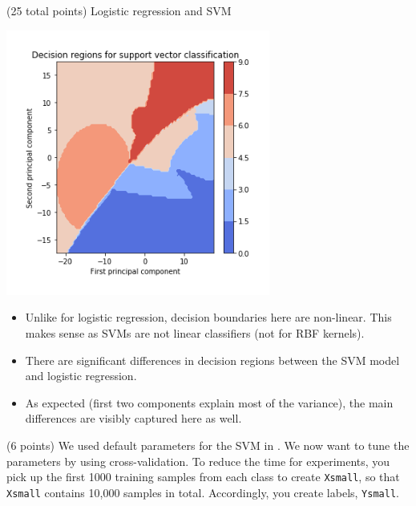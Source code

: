 \documentclass[12pt]{article}
\begin{document}
\begin{question}{(25 total points) Logistic regression and SVM}
\begin{subquestion}
      \begin{answerbox}{35em}
                           \begin{center}
	\includegraphics[width=0.65\textwidth]{imgs/2_4.png}
	\end{center}
	\begin{itemize}
	\itemsep -3pt {}
	\item Unlike for logistic regression, decision boundaries here are non-linear. This makes sense as SVMs are not linear classifiers (not for RBF kernels).
	\item There are significant differences in decision regions between the SVM model and logistic regression.
	\item As expected (first two components explain most of the variance), the main differences are visibly captured here as well.
	\end{itemize}
      \end{answerbox}
  


   \end{subquestion}

   \begin{subquestion}{(6 points)
       We used default parameters for the SVM in .
       We now want to tune the parameters by using cross-validation.
       To reduce the time for experiments, you pick up the first 1000
       training samples from each class to create \texttt{Xsmall}, so that \texttt{Xsmall}
       contains 10,000 samples in total. Accordingly, you create
       labels, \texttt{Ysmall}.
     } \label{Q2.5}



\end{subquestion}
\end{question}
\end{document}
